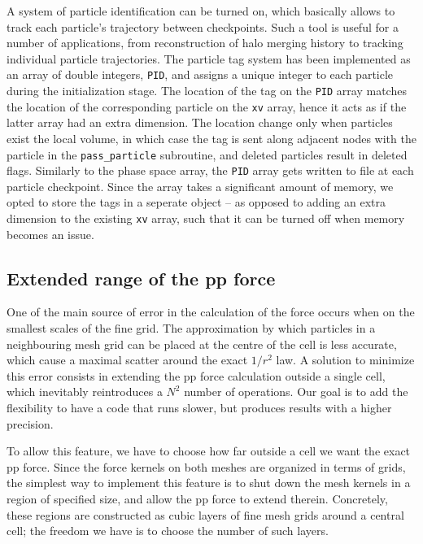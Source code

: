 \documentclass[useAMS,usenatbib]{mn2e}
\begin{document}
A system of particle identification can be turned on, which basically allows to track each particle's trajectory
between checkpoints. Such a tool is useful for a number of applications, from reconstruction of halo merging history to tracking individual particle
trajectories.
The particle tag system has been implemented as an array of double integers, {\tt PID}, 
and assigns a unique integer to each particle during the initialization stage. The location of the tag on the {\tt PID} array 
matches the location of the corresponding particle on the {\tt xv} array, hence it acts as if the latter array had an extra dimension.
The location change only when particles exist the local volume, in which case the tag is sent along adjacent nodes 
with the particle in the {\tt pass\_particle} subroutine, and deleted particles result in deleted flags.
Similarly to the phase space array, the {\tt PID} array gets written to file at each particle checkpoint.
Since the array takes a significant amount of memory, we opted to store the tags in a seperate object
-- as opposed to adding  an extra dimension to the existing {\tt xv} array, such that it can be turned off 
when memory becomes an issue.
 
\subsection{Extended range of the pp force}
\label{subsec:extendedpp} 

One of the main source of error in the calculation of the force occurs when on the smallest scales of the fine grid.
The approximation by which particles in a neighbouring mesh grid can be placed at the centre of the cell
is less accurate, which cause a maximal scatter around the exact $1/r^2$ law.
A solution to minimize this error consists in extending the pp force calculation outside a single cell,
which inevitably reintroduces a $N^2$ number of operations. Our goal is to add the flexibility to have a code
that runs slower, but produces results with a higher precision. 

To allow this feature, we  have to choose how far outside a cell we want the exact pp force.  
Since the force kernels on both meshes are organized in terms of grids, the simplest way to implement this 
feature is to shut down the mesh kernels in a region of specified size, and allow the pp force to extend therein.
Concretely, these regions are constructed as cubic layers of fine mesh grids around a central cell; 
the freedom we have is to choose the number of such layers.
 
\end{document}
